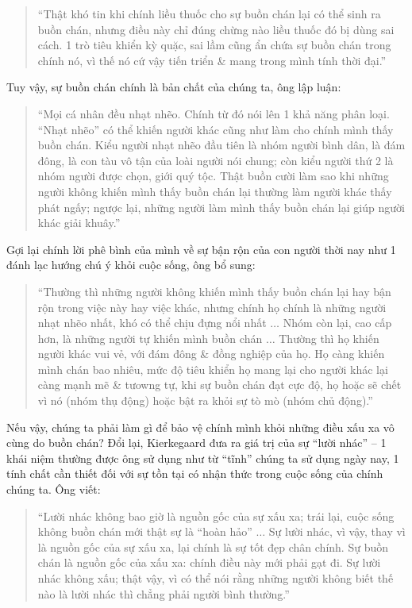 \documentclass{article}
\begin{document}
\begin{enumerate}
	\begin{quote}
		``Thật khó tin khi chính liều thuốc cho sự buồn chán lại có thể sinh ra buồn chán, nhưng điều này chỉ đúng chừng nào liều thuốc đó bị dùng sai cách. 1 trò tiêu khiển kỳ quặc, sai lầm cũng ẩn chứa sự buồn chán trong chính nó, vì thế nó cứ vậy tiến triển \& mang trong mình tính thời đại.''
	\end{quote}
	Tuy vậy, sự buồn chán chính là bản chất của chúng ta, ông lập luận:
	\begin{quote}
		``Mọi cá nhân đều nhạt nhẽo. Chính từ đó nói lên 1 khả năng phân loại. ``Nhạt nhẽo'' có thể khiến người khác cũng như làm cho chính mình thấy buồn chán. Kiểu người nhạt nhẽo đầu tiên là nhóm người bình dân, là đám đông, là con tàu vô tận của loài người nói chung; còn kiểu người thứ 2 là nhóm người được chọn, giới quý tộc. Thật buồn cười làm sao khi những người không khiến mình thấy buồn chán lại thường làm người khác thấy phát ngấy; ngược lại, những người làm mình thấy buồn chán lại giúp người khác giải khuây.''
	\end{quote}
	Gợi lại chính lời phê bình của mình về sự bận rộn của con người thời nay như 1 đánh lạc hướng chú ý khỏi cuộc sống, ông bổ sung:
	\begin{quote}
		``Thường thì những người không khiến mình thấy buồn chán lại hay bận rộn trong việc này hay việc khác, nhưng chính họ chính là những người nhạt nhẽo nhất, khó có thể chịu đựng nổi nhất $\ldots$ Nhóm còn lại, cao cấp hơn, là những người tự khiến mình buồn chán $\ldots$ Thường thì họ khiến người khác vui vẻ, với đám đông \& đồng nghiệp của họ. Họ càng khiến mình chán bao nhiêu, mức độ tiêu khiển họ mang lại cho người khác lại càng mạnh mẽ \& tưowng tự, khi sự buồn chán đạt cực độ, họ hoặc sẽ chết vì nó (nhóm thụ động) hoặc bật ra khỏi sự tò mò (nhóm chủ động).''
	\end{quote}
	Nếu vậy, chúng ta phải làm gì để bảo vệ chính mình khỏi những điều xấu xa vô cùng do buồn chán? Đổi lại, {\sc Kierkegaard} đưa ra giá trị của sự ``lười nhác'' -- 1 khái niệm thường được ông sử dụng như từ ``tĩnh'' chúng ta sử dụng ngày nay, 1 tính chất cần thiết đối với sự tồn tại có nhận thức trong cuộc sống của chính chúng ta. Ông viết:
	\begin{quote}
		``Lười nhác không bao giờ là nguồn gốc của sự xấu xa; trái lại, cuộc sống không buồn chán mới thật sự là ``hoàn hảo'' $\ldots$ Sự lười nhác, vì vậy, thay vì là nguồn gốc của sự xấu xa, lại chính là sự tốt đẹp chân chính. Sự buồn chán là nguồn gốc của xấu xa: chính điều này mới phải gạt đi. Sự lười nhác không xấu; thật vậy, vì có thể nói rằng những người không biết thế nào là lười nhác thì chẳng phải người bình thường.''

\end{quote}
\end{enumerate}
\end{document}
